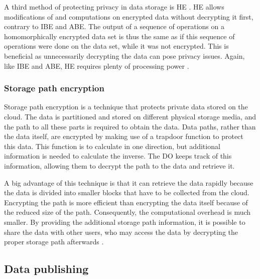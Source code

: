 A third method of protecting privacy in data storage is \gls{HE} \cite{Jain2016, Mehmood2016}.
\gls{HE} allows modifications of and computations on encrypted data without decrypting it first, contrary to \gls{IBE} and \gls{ABE}.
The output of a sequence of operations on a homomorphically encrypted data set is thus the same as if this sequence of operations were done on the data set,
while it was not encrypted.
This is beneficial as unnecessarily decrypting the data can pose privacy issues.
Again, like \gls{IBE} and \gls{ABE}, \gls{HE} requires plenty of processing power \cite{Jain2016, Mehmood2016}.

\subsubsection{Storage path encryption}

Storage path encryption \cite{Jain2016, Cheng2015} is a technique that protects private data stored on the cloud.
The data is partitioned and stored on different physical storage media, and the path to all these parts is required to obtain the data. 
Data paths, rather than the data itself, are encrypted by making use of a trapdoor function to protect this data.
This function is to calculate in one direction, but additional information is needed to calculate the inverse. 
The \gls{DO} keeps track of this information, allowing them to decrypt the path to the data and retrieve it. 

A big advantage of this technique is that it can retrieve the data rapidly because the data is divided into smaller blocks that have to be collected from the cloud.
Encrypting the path is more efficient than encrypting the data itself because of the reduced size of the path. Consequently, the computational overhead is much smaller.
By providing the additional storage path information,
it is possible to share the data with other users,
who may access the data by decrypting the proper storage path afterwards \cite{Jain2016, Cheng2015}.


\subsection{Data publishing}
\label{s:DataPublishing}

